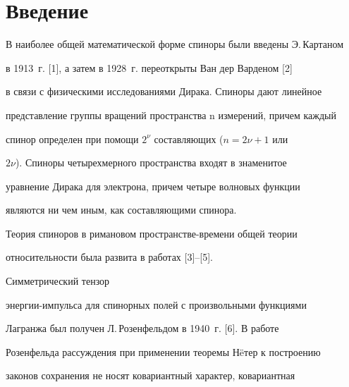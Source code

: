 \pagestyle{plain} %













\maketitle


\label{begin}





\section*{Введение}





В наиболее общей математической форме спиноры были введены Э.\,Картаном


в 1913~г. [1], а  затем в 1928~г. переоткрыты Ван дер Варденом [2]


в связи с физическими исследованиями Дирака. Спиноры дают линейное


представление группы вращений пространства n измерений, причем каждый


спинор определен при помощи $2^\nu$ составляющих ($n=2\nu+1$ или


$2\nu$). Спиноры четырехмерного пространства входят в знаменитое


уравнение Дирака для электрона, причем четыре волновых функции


являются ни чем иным, как составляющими спинора.





Теория спиноров в римановом пространстве-времени общей теории


относительности была развита в работах [3]--[5].


Симметрический тензор


энергии-импульса для спинорных полей с произвольными функциями


Лагранжа был получен Л.\,Розенфельдом в 1940~г. [6]. В работе


Розенфельда рассуждения при применении теоремы Н\"eтер к построению


законов сохранения не носят ковариантный характер, ковариантная


